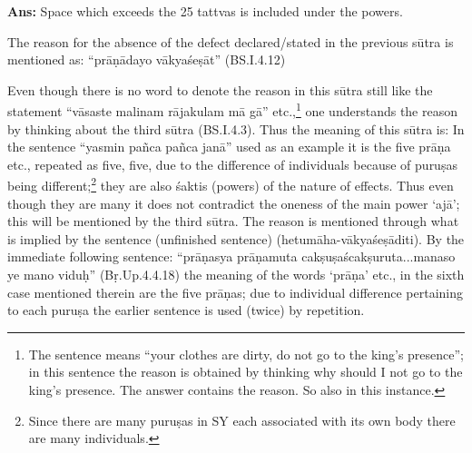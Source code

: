 \textbf{Ans:} Space which exceeds the 25 tattvas is included under the powers.

The reason for the absence of the defect declared/stated in the previous sūtra is mentioned as: “prāṇādayo vākyaśeṣāt” (BS.I.4.12)

\textbf{}



Even though there is no word to denote the reason in this sūtra still like the statement “vāsaste malinam rājakulam mā gā” etc.,\footnote{The sentence means “your clothes are dirty, do not go to the king’s presence”; in this sentence the reason is obtained by thinking why should I not go to the king’s presence. The answer contains the reason. So also in this instance.} one understands the reason by thinking about the third sūtra (BS.I.4.3). Thus the meaning of this sūtra is: In the sentence “yasmin pañca pañca janā” used as an example it is the five prāṇa etc., repeated as five, five, due to the difference of individuals because of puruṣas being different;\footnote{Since there are many puruṣas in SY each associated with its own body there are many individuals.} they are also śaktis (powers) of the nature of effects. Thus even though they are many it does not contradict the oneness of the main power ‘ajā’; this will be mentioned by the third sūtra. The reason is mentioned through what is implied by the sentence  (unfinished sentence) (hetumāha-vākyaśeṣāditi). By the immediate following sentence: “prāṇasya prāṇamuta cakṣuṣaścakṣuruta...manaso ye mano viduḥ” (Bṛ.Up.4.4.18) the meaning of the words ‘prāṇa’ etc., in the sixth case mentioned therein are the five prāṇas; due to  individual difference pertaining to each puruṣa the earlier sentence is used (twice) by repetition.

